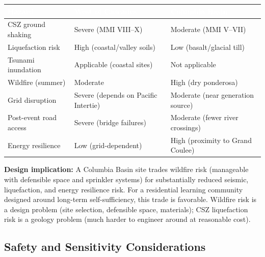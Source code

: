 \documentclass[11pt,letterpaper]{article}
\newcommand{\tableheader}[1]{\textbf{\sffamily\textcolor{white}{#1}}}
\begin{document}
\begin{center}
\begin{tabularx}{\textwidth}{L{3.5cm}C{3cm}C{3cm}}
\toprule
{}
\tableheader{Hazard} & \tableheader{West of Cascades} & \tableheader{Columbia Basin} \\
\midrule
CSZ ground shaking & Severe (MMI VIII--X) & Moderate (MMI V--VII) \\
Liquefaction risk & High (coastal/valley soils) & Low (basalt/glacial till) \\
Tsunami inundation & Applicable (coastal sites) & Not applicable \\
Wildfire (summer) & Moderate & High (dry ponderosa) \\
Grid disruption & Severe (depends on Pacific Intertie) & Moderate (near generation source) \\
Post-event road access & Severe (bridge failures) & Moderate (fewer river crossings) \\
Energy resilience & Low (grid-dependent) & High (proximity to Grand Coulee) \\
\bottomrule
\end{tabularx}
\end{center}

\textbf{Design implication:} A Columbia Basin site trades wildfire risk (manageable with defensible space and sprinkler systems) for substantially reduced seismic, liquefaction, and energy resilience risk. For a residential learning community designed around long-term self-sufficiency, this trade is favorable. Wildfire risk is a design problem (site selection, defensible space, materials); CSZ liquefaction risk is a geology problem (much harder to engineer around at reasonable cost).

\subsection{Safety and Sensitivity Considerations}
\end{document}
